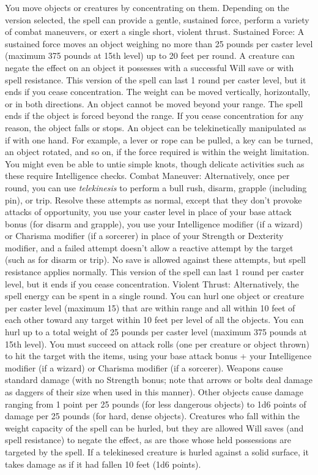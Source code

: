 You move objects or creatures by concentrating on them. Depending on the version
selected, the spell can provide a gentle, sustained force, perform a variety of
combat maneuvers, or exert a single short, violent thrust.
Sustained Force: A sustained force moves an object weighing no more than
25 pounds per caster level (maximum 375 pounds at 15th level) up to 20 feet per
round. A creature can negate the effect on an object it possesses with a successful
Will save or with spell resistance.
This version of the spell can last 1 round per caster level, but it ends if you
cease concentration. The weight can be moved vertically, horizontally, or in both
directions. An object cannot be moved beyond your range. The spell ends if the
object is forced beyond the range. If you cease concentration for any reason, the
object falls or stops.
An object can be telekinetically manipulated as if with one hand. For example,
a lever or rope can be pulled, a key can be turned, an object rotated, and so on,
if the force required is within the weight limitation. You might even be able to
untie simple knots, though delicate activities such as these require Intelligence
checks.
Combat Maneuver: Alternatively, once per round, you can use \textit{telekinesis
}to perform a bull rush, disarm, grapple (including pin), or trip. Resolve these
attempts as normal, except that they don't provoke attacks of opportunity, you
use your caster level in place of your base attack bonus (for disarm and grapple),
you use your Intelligence modifier (if a wizard) or Charisma modifier (if a sorcerer)
in place of your Strength or Dexterity modifier, and a failed attempt doesn't allow
a reactive attempt by the target (such as for disarm or trip). No save is allowed
against these attempts, but spell resistance applies normally. This version of
the spell can last 1 round per caster level, but it ends if you cease concentration.
Violent Thrust: Alternatively, the spell energy can be spent in a single
round. You can hurl one object or creature per caster level (maximum 15) that are
within range and all within 10 feet of each other toward any target within 10 feet
per level of all the objects. You can hurl up to a total weight of 25 pounds per
caster level (maximum 375 pounds at 15th level).
You must succeed on attack rolls (one per creature or object thrown) to hit the
target with the items, using your base attack bonus + your Intelligence modifier
(if a wizard) or Charisma modifier (if a sorcerer). Weapons cause standard damage
(with no Strength bonus; note that arrows or bolts deal damage as daggers of their
size when used in this manner). Other objects cause damage ranging from 1 point
per 25 pounds (for less dangerous objects) to 1d6 points of damage per 25 pounds
(for hard, dense objects).
Creatures who fall within the weight capacity of the spell can be hurled, but they
are allowed Will saves (and spell resistance) to negate the effect, as are those
whose held possessions are targeted by the spell. If a telekinesed creature is
hurled against a solid surface, it takes damage as if it had fallen 10 feet (1d6
points).